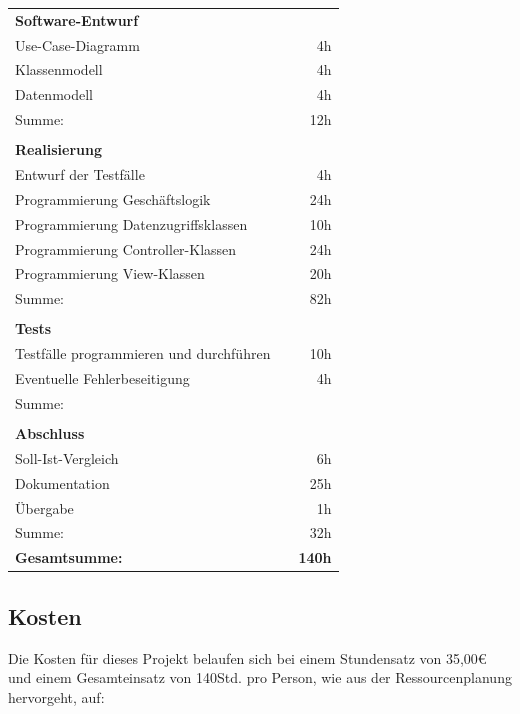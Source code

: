 \documentclass[10.5pt]{scrarticle}
\begin{document}
\FloatBarrier
\begin{table}[ht!]
\begin{tabular}{lcr}
    \multicolumn{3}{l}{\textbf{Software-Entwurf}}\\
    Use-Case-Diagramm& &4h\\
    Klassenmodell & & 4h\\
    Datenmodell & & 4h\\
    \hline
    Summe: & & 12h\\
    \\
    \multicolumn{3}{l}{\textbf{Realisierung}}\\
    Entwurf der Testfälle & &  4h\\
    Programmierung Geschäftslogik& &  24h\\
    Programmierung Datenzugriffsklassen	& &  10h\\
    Programmierung Controller-Klassen& &  24h\\
    Programmierung View-Klassen& &  20h\\
    \hline
    Summe: & & 82h\\
    \\
    \multicolumn{3}{l}{\textbf{Tests}}\\
    Testfälle programmieren und durchführen& &10h\\
    Eventuelle Fehlerbeseitigung& &4h\\
    \hline
    Summe: & &\\
    \\
    \multicolumn{3}{l}{\textbf{Abschluss}}\\
    Soll-Ist-Vergleich& & 6h\\
    Dokumentation& & 25h\\
    Übergabe & & 1h\\
    \hline
    Summe: & &32h\\
   \textbf{Gesamtsumme:} & &\textbf{ 140h}

\end{tabular}
\end{table}
\FloatBarrier


\subsection{Kosten}

Die Kosten für dieses Projekt belaufen sich bei einem Stundensatz von 35,00\euro{} und einem Gesamteinsatz von 140Std. pro Person, wie aus der Ressourcenplanung hervorgeht, auf:
\end{document}
